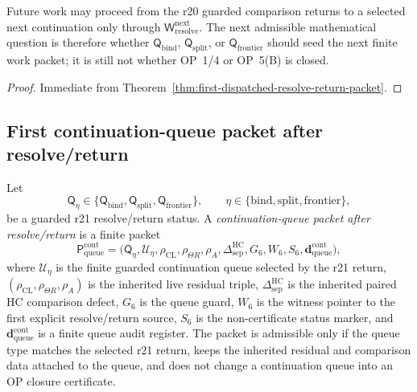 \begin{corollary}
\label{cor:v3340-r21-working-rule}
Future work may proceed from the r20 guarded comparison returns to a selected next continuation only through \(\mathsf W_{\mathrm{resolve}}^{\mathrm{next}}\).  The next admissible mathematical question is therefore whether \(\mathsf Q_{\mathrm{bind}}\), \(\mathsf Q_{\mathrm{split}}\), or \(\mathsf Q_{\mathrm{frontier}}\) should seed the next finite work packet; it is still not whether OP~1/4 or OP~5(B) is closed.
\end{corollary}

\begin{proof}
Immediate from Theorem~\ref{thm:first-dispatched-resolve-return-packet}.
\end{proof}


\subsection{First continuation-queue packet after resolve/return}
\label{subsec:first-continuation-queue-packet-after-resolve-return}

\begin{definition}
\label{def:continuation-queue-packet-after-resolve-return}
Let
\[
  \mathsf Q_{\eta}\in
  \{\mathsf Q_{\mathrm{bind}},\mathsf Q_{\mathrm{split}},\mathsf Q_{\mathrm{frontier}}\},
  \qquad
  \eta\in\{\mathrm{bind},\mathrm{split},\mathrm{frontier}\},
\]
be a guarded r21 resolve/return status.  A \emph{continuation-queue packet after resolve/return} is a finite packet
\[
  \mathsf P_{\mathrm{queue}}^{\mathrm{cont}}
  =
  \bigl(
    \mathsf Q_{\eta},
    \mathcal U_{\eta},
    \rho_{\mathrm{CL}},\rho_{\Theta R},\rho_A,
    \Delta_{\mathrm{sep}}^{\mathrm{HC}},
    G_6,W_6,S_6,
    \mathbf d_{\mathrm{queue}}^{\mathrm{cont}}
  \bigr),
\]
where \(\mathcal U_{\eta}\) is the finite guarded continuation queue selected by the r21 return, \((\rho_{\mathrm{CL}},\rho_{\Theta R},\rho_A)\) is the inherited live residual triple, \(\Delta_{\mathrm{sep}}^{\mathrm{HC}}\) is the inherited paired HC comparison defect, \(G_6\) is the queue guard, \(W_6\) is the witness pointer to the first explicit resolve/return source, \(S_6\) is the non-certificate status marker, and \(\mathbf d_{\mathrm{queue}}^{\mathrm{cont}}\) is a finite queue audit register.  The packet is admissible only if the queue type matches the selected r21 return, keeps the inherited residual and comparison data attached to the queue, and does not change a continuation queue into an OP closure certificate.
\end{definition}

